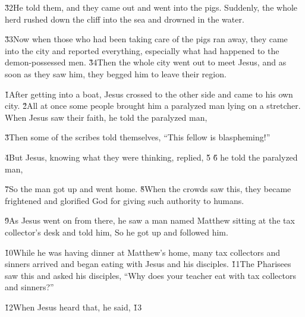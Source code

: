 \v{32}He told them,  and they came out and went into the pigs. Suddenly, the whole herd rushed down the cliff into the sea and drowned in the water.

\v{33}Now when those who had been taking care of the pigs ran away, they came into the city and reported everything, especially what had happened to the demon-possessed men. \v{34}Then the whole city went out to meet Jesus, and as soon as they saw him, they begged him to leave their region.

\v{1}After getting into a boat, Jesus crossed to the other side and came to his own city. \v{2}All at once some people brought him a paralyzed man lying on a stretcher. When Jesus saw their faith, he told the paralyzed man, 

\v{3}Then some of the scribes told themselves, ``This fellow is blaspheming!''

\v{4}But Jesus, knowing what they were thinking, replied,  \v{5} \v{6} he told the paralyzed man, 

\v{7}So the man got up and went home. \v{8}When the crowds saw this, they became frightened and glorified God for giving such authority to humans.

\v{9}As Jesus went on from there, he saw a man named Matthew sitting at the tax collector's desk and told him,  So he got up and followed him.

\v{10}While he was having dinner at Matthew's home, many tax collectors and sinners arrived and began eating with Jesus and his disciples. \v{11}The Pharisees saw this and asked his disciples, ``Why does your teacher eat with tax collectors and sinners?''

\v{12}When Jesus heard that, he said,  \v{13}


